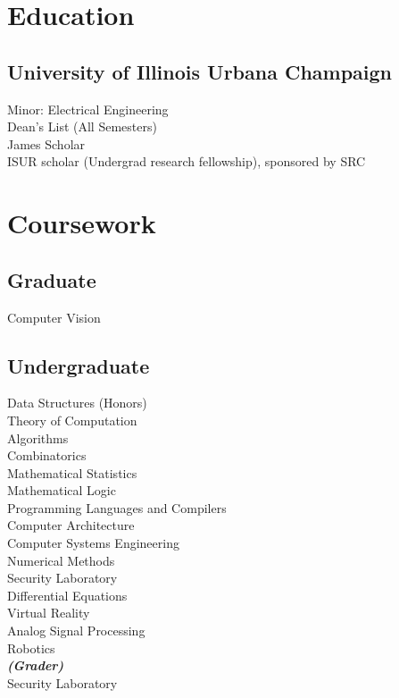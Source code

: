 \documentclass[]{bhargee-resume}
\begin{document}

\begin{minipage}[t]{0.33\textwidth} 

\section{Education} 

\subsection{University of Illinois Urbana Champaign}
Minor: Electrical Engineering \\
Dean's List (All Semesters) \\
James Scholar \\
ISUR scholar (Undergrad research fellowship), sponsored by SRC
\sectionsep

\section{Coursework}
\subsection{Graduate}
Computer Vision \\
\sectionsep

\subsection{Undergraduate}
Data Structures (Honors)\\
Theory of Computation \\
Algorithms \\
Combinatorics \\
Mathematical Statistics \\
Mathematical Logic \\
Programming Languages and Compilers \\
Computer Architecture \\
Computer Systems Engineering \\
Numerical Methods \\
Security Laboratory \\
Differential Equations \\
Virtual Reality \\
Analog Signal Processing \\
Robotics \\
{\footnotesize \textit{\textbf{(Grader) }}} \\
Security Laboratory \\
\sectionsep


\end{minipage}
\end{document}
